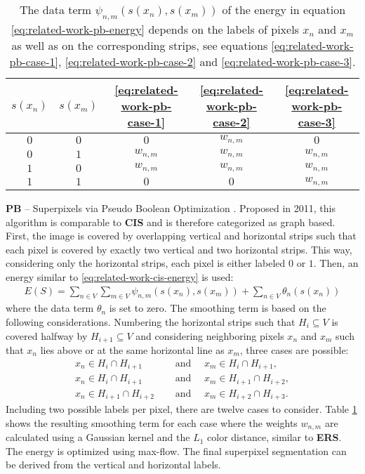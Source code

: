 \begin{table}[t]
	\centering
	\begin{tabular}{|c c c c c|}
		\hline
		$s(x_n)$ & $s(x_m)$ & \eqref{eq:related-work-pb-case-1} & \eqref{eq:related-work-pb-case-2}  & \eqref{eq:related-work-pb-case-3} \\\hline\hline
		$0$ & $0$ & $0$ & $w_{n,m}$ & $0$\\
		$0$ & $1$ & $w_{n,m}$ & $w_{n,m}$ & $w_{n,m}$\\
		$1$ & $0$ & $w_{n,m}$ & $w_{n,m}$ & $w_{n,m}$\\
		$1$ & $1$ & $0$ & $0$ & $w_{n,m}$\\\hline
	\end{tabular}
	\caption[The data term of the energy used by \textbf{PB} \cite{ZhangHartleyMashfordBurn:2011}.]{The data term $\psi_{n,m}(s(x_n),s(x_m))$ of the energy in equation \eqref{eq:related-work-pb-energy} depends on the labels of pixels $x_n$ and $x_m$ as well as on the corresponding strips, see equations \eqref{eq:related-work-pb-case-1}, \eqref{eq:related-work-pb-case-2} and \eqref{eq:related-work-pb-case-3}.}
	\label{table:related-work-pb}
\end{table}
\textbf{PB} -- Superpixels via Pseudo Boolean Optimization \cite{ZhangHartleyMashfordBurn:2011}. Proposed in 2011, this algorithm is comparable to \textbf{CIS} and is therefore categorized as graph based. First, the image is covered by overlapping vertical and horizontal strips such that each pixel is covered by exactly two vertical and two horizontal strips. This way, considering only the horizontal strips, each pixel is either labeled $0$ or $1$. Then, an energy similar to \eqref{eq:related-work-cis-energy} is used:
\begin{align}
	\label{eq:related-work-pb-energy}
	E(S) = \sum_{n \in V} \sum_{m \in V}  \psi_{n,m}(s(x_n),s(x_m)) + \sum_{n \in V} \theta_n(s(x_n))
\end{align}
where the data term $\theta_n$ is set to zero. The smoothing term is based on the following considerations. Numbering the horizontal strips such that $H_i \subseteq V$ is covered halfway by $H_{i+1} \subseteq V$ and considering neighboring pixels $x_n$ and $x_m$ such that $x_n$ lies above or at the same horizontal line as $x_m$, three cases are possible:
\begin{align}
	\label{eq:related-work-pb-case-1}
	x_n \in H_i \cap H_{i+1}\quad&\text{ and }\quad x_m \in H_i \cap H_{i+1},\\
	\label{eq:related-work-pb-case-2}
	x_n \in H_i \cap H_{i+1}\quad&\text{ and }\quad x_m \in H_{i+1} \cap H_{i+2},\\
	\label{eq:related-work-pb-case-3}
	x_n \in H_{i+1} \cap H_{i+2}\quad&\text{ and }\quad x_m \in H_{i+2} \cap H_{i+3}.
\end{align}
Including two possible labels per pixel, there are twelve cases to consider. Table \ref{table:related-work-pb} shows the resulting smoothing term for each case where the weights $w_{n,m}$ are calculated using a Gaussian kernel and the $L_1$ color distance, similar to \textbf{ERS}. The energy is optimized using max-flow. The final superpixel segmentation can be derived from the vertical and horizontal labels.

